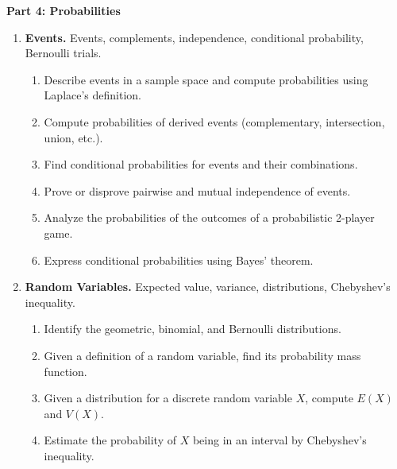 \documentclass[a4paper,12pt]{article}
\begin{document}
\vspace{10pt}
{\bf Part 4: Probabilities}

{\small
\begin{enumerate}
\item \textbf{Events.} Events, complements, independence, conditional probability, Bernoulli trials.
\begin{enumerate}
\item Describe events in a sample space and compute probabilities using Laplace's definition.
\item Compute probabilities of derived events (complementary, intersection, union, etc.).
\item Find conditional probabilities for events and their combinations.
\item Prove or disprove pairwise and mutual independence of events.
\item Analyze the probabilities of the outcomes of a probabilistic 2-player game.
\item Express conditional probabilities using Bayes' theorem.
\end{enumerate}


\item \textbf{Random Variables.} Expected value, variance, distributions, Chebyshev's inequality.
\begin{enumerate}
\item Identify the geometric, binomial, and Bernoulli distributions.
\item Given a definition of a random variable, find its probability mass function.
\item Given a distribution for a discrete random variable $X$, compute $E(X)$ and $V(X)$.
\item Estimate the probability of $X$ being in an interval by Chebyshev's inequality.
\end{enumerate}
\end{enumerate}
}
\end{document}
